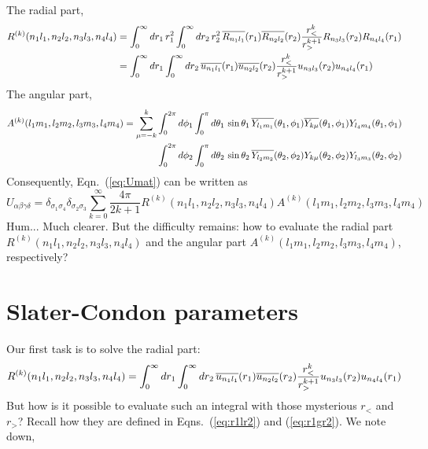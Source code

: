The radial part,
\begin{align} \label{eq:radPart}
R^{(k)}(n_1l_1,n_2l_2,n_3l_3,n_4l_4) & = \int_0^\infty dr_1\,r_1^2 \int_0^\infty dr_2\,r_2^2\, \overline{R_{n_1l_1}}(r_1) \overline{R_{n_2l_2}}(r_2)
                                     \frac{r_<^k}{r_>^{k+1}} R_{n_3l_3}(r_2) R_{n_4l_4}(r_1) \nonumber \\
& = \int_0^\infty dr_1 \int_0^\infty dr_2\, \overline{u_{n_1l_1}}(r_1) \overline{u_{n_2l_2}}(r_2)
    \frac{r_<^k}{r_>^{k+1}} u_{n_3l_3}(r_2) u_{n_4l_4}(r_1)
\end{align}
%
The angular part,
\begin{align} \label{eq:angPart}
A^{(k)}(l_1m_1,l_2m_2,l_3m_3,l_4m_4) = \sum_{\mu=-k}^k
& \int_0^{2\pi}d\phi_1 \int_0^{\pi}d\theta_1\,\sin{\theta_1}\,
  \overline{Y_{l_1m_1}}(\theta_1,\phi_1) \overline{Y_{k\mu}}(\theta_1,\phi_1) Y_{l_4m_4}(\theta_1,\phi_1) \nonumber \\
& \int_0^{2\pi}d\phi_2 \int_0^{\pi}d\theta_2\,\sin{\theta_2}\,
  \overline{Y_{l_2m_2}}(\theta_2,\phi_2) Y_{k\mu}(\theta_2,\phi_2) Y_{l_3m_3}(\theta_2,\phi_2)
\end{align}
%
Consequently, Eqn.~(\ref{eq:Umat}) can be written as
\begin{equation} \label{eq:UmatExp}
\boxed{
U_{\alpha\beta\gamma\delta} =
\delta_{\sigma_1\sigma_4} \delta_{\sigma_2\sigma_3}
\sum_{k=0}^\infty \frac{4\pi}{2k+1} R^{(k)}(n_1l_1,n_2l_2,n_3l_3,n_4l_4)
A^{(k)}(l_1m_1,l_2m_2,l_3m_3,l_4m_4)
}
\end{equation}
Hum... Much clearer. But the difficulty remains: how to evaluate the radial part
$R^{(k)}(n_1l_1,n_2l_2,n_3l_3,n_4l_4)$ and the angular part $A^{(k)}(l_1m_1,l_2m_2,l_3m_3,l_4m_4)$,
respectively?

\section{Slater-Condon parameters}
Our first task is to solve the radial part:
\begin{equation} \label{eq:Rk}
R^{(k)}(n_1l_1,n_2l_2,n_3l_3,n_4l_4) =
\int_0^\infty dr_1 \int_0^\infty dr_2\, \overline{u_{n_1l_1}}(r_1) \overline{u_{n_2l_2}}(r_2)
\frac{r_<^k}{r_>^{k+1}} u_{n_3l_3}(r_2) u_{n_4l_4}(r_1)
\end{equation}
%
But how is it possible to evaluate such an integral with those mysterious $r_<$
and $r_>$? Recall how they are defined in Eqns.~(\ref{eq:r1lr2}) and (\ref{eq:r1gr2}).
We note down,

